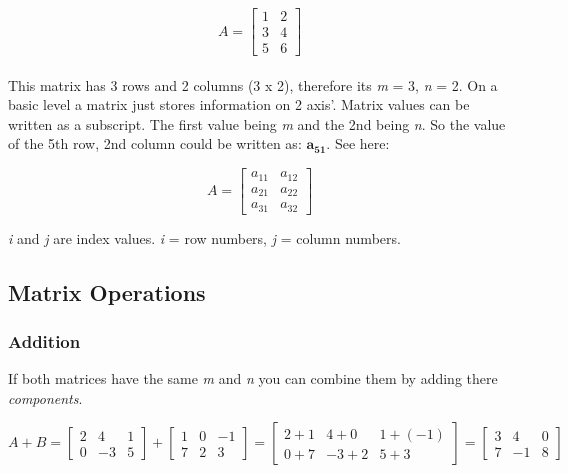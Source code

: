 \documentclass[12pt]{report}
\begin{document}
        \begin{equation}
            {A} = \begin{bmatrix} 
                1 & 2 \\ 
                3 & 4 \\ 
                5 & 6
            \end{bmatrix}
        \end{equation} \\

        This matrix has 3 rows and 2 columns (3 x 2), therefore its \emph{m} = 3, \emph{n} = 2.
        On a basic level a matrix just stores information on 2 axis'. Matrix values can be written as a subscript. The first value being \emph{m} and the 2nd being \emph{n}. So the value of the 5th row, 2nd column could be written as: $\mathbf{a_{51}}$. See here:
        
        \begin{equation}
            {A} = \begin{bmatrix} 
                a_{11} & a_{12} \\ 
                a_{21} & a_{22} \\ 
                a_{31} & a_{32}
            \end{bmatrix}
        \end{equation} 

        \emph{i} and \emph{j} are index values. \emph{i} = row numbers, \emph{j} = column numbers.

        \subsection{Matrix Operations}
            \subsubsection{Addition}
                If both matrices have the same \emph{m} and \emph{n} you can combine them by adding there \emph{components}.

                \begin{equation}
                A + B =
                    \begin{bmatrix} 2 & 4 & 1 \\ 0 & -3 & 5 \end{bmatrix} +
                    \begin{bmatrix} 1 & 0 & -1 \\ 7 & 2 & 3 \end{bmatrix} =
                    \begin{bmatrix} 2 + 1 & 4 + 0 & 1 + (-1) \\ 0 + 7 & -3 + 2 & 5 + 3 \end{bmatrix} =
                    \begin{bmatrix} 3 & 4 & 0 \\ 7 & -1 & 8 \end{bmatrix}
                \end{equation}
\end{document}
